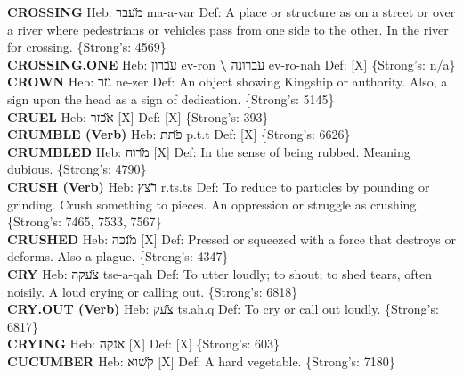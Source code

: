 {\textbf{CROSSING} Heb: {\large\H מעבר} ma-a-var Def: A place or structure as on a street or over a river where pedestrians or vehicles pass from one side to the other. In the river for crossing. \{Strong's: 4569\}\hfill{}\\

\textbf{CROSSING.ONE} Heb: {\large\H עברון} ev-ron \textbf{\textbackslash{}} {\large\H עברונה} ev-ro-nah Def: {[}X{]} \{Strong's: n/a\}\hfill{}\\

\textbf{CROWN} Heb: {\large\H נזר} ne-zer Def: An object showing Kingship or authority. Also, a sign upon the head as a sign of dedication. \{Strong's: 5145\}\hfill{}\\

\textbf{CRUEL} Heb: {\large\H אכזר} {[}X{]} Def: {[}X{]} \{Strong's: 393\}\hfill{}\\

\textbf{CRUMBLE (Verb)} Heb: {\large\H פתת} p.t.t Def: {[}X{]} \{Strong's: 6626\}\hfill{}\\

\textbf{CRUMBLED} Heb: {\large\H מרוח} {[}X{]} Def: In the sense of being rubbed. Meaning dubious. \{Strong's: 4790\}\hfill{}\\

\textbf{CRUSH (Verb)} Heb: {\large\H רצץ} r.ts.ts Def: To reduce to particles by pounding or grinding. Crush something to pieces. An oppression or struggle as crushing. \{Strong's: 7465, 7533, 7567\}\hfill{}\\

\textbf{CRUSHED} Heb: {\large\H מנכה} {[}X{]} Def: Pressed or squeezed with a force that destroys or deforms. Also a plague. \{Strong's: 4347\}\hfill{}\\

\textbf{CRY} Heb: {\large\H צעקה} tse-a-qah Def: To utter loudly; to shout; to shed tears, often noisily. A loud crying or calling out. \{Strong's: 6818\}\hfill{}\\

\textbf{CRY.OUT (Verb)} Heb: {\large\H צעק} ts.ah.q Def: To cry or call out loudly. \{Strong's: 6817\}\hfill{}\\

\textbf{CRYING} Heb: {\large\H אנקה} {[}X{]} Def: {[}X{]} \{Strong's: 603\}\hfill{}\\

\textbf{CUCUMBER} Heb: {\large\H קשוא} {[}X{]} Def: A hard vegetable. \{Strong's: 7180\}\hfill{}\\

}
